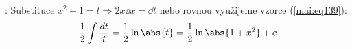 \begin{mdframed}[style=mdmathsolution]
  [\ref{mai:eq141}]: Substituce \(x^2 + 1 = t  \Rightarrow 2x\dd{x} = \dd{t}\) nebo rovnou využijeme
  vzorce (\ref{mai:eq139}):
  \begin{equation*}
    \frac{1}{2}\int\frac{dt}{t} = \frac{1}{2}\ln\abs{t} =\frac{1}{2}\ln\abs{1+x^2}+ c
  \end{equation*}
\end{mdframed}